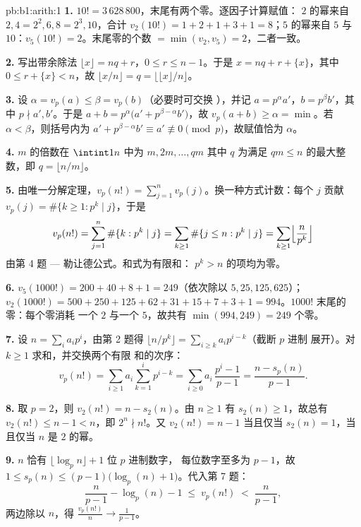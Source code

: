 \begin{solution}{pb:b1:arith:1}
\textbf{1.} $10! = 3\,628\,800$，末尾有两个零。逐因子计算赋值：
$2$ 的幂来自 $2, 4 = 2^2, 6, 8 = 2^3,
10$，合计 $v_2(10!) = 1 + 2 + 1 + 3 + 1 = 8$；$5$ 的幂来自
$5$ 与 $10$：$v_5(10!) = 2$。末尾零的个数 $=
\min(v_2, v_5) = 2$，二者一致。

\textbf{2.} 写出带余除法 $\lfloor x\rfloor = nq +
r$，$0 \leq r \leq n - 1$。于是 $x = nq + r + \{x\}$，其中 $0 \leq
r + \{x\} < n$，故 $\lfloor x/n \rfloor = q = \bigl\lfloor \lfloor
x \rfloor / n \bigr\rfloor$。

\textbf{3.} 设 $\alpha = v_p(a) \leq \beta = v_p(b)$（必要时可交换
），并记 $a = p^\alpha a'$，$b = p^\beta b'$，其中 $p
\nmid a', b'$。于是 $a + b = p^\alpha\bigl(a' + p^{\beta -
\alpha}b'\bigr)$，故 $v_p(a + b) \geq \alpha = \min$。若 $\alpha <
\beta$，则括号内为 $a' + p^{\beta-\alpha}b' \equiv a'
\not\equiv 0 \pmod p$，故赋值恰为 $\alpha$。

\textbf{4.} $m$ 的倍数在 $\intint1n$ 中为 $m, 2m, \dots,
qm$ 其中 $q$ 为满足 $qm \leq n$ 的最大整数，即 $q =
\lfloor n/m \rfloor$。

\textbf{5.} 由唯一分解定理，$v_p(n!) = \sum_{j=1}^{n}
v_p(j)$。换一种方式计数：每个 $j$ 贡献 $v_p(j) =
\#\{k \geq 1 : p^k \mid j\}$，于是
\[
v_p(n!) = \sum_{j=1}^n \#\{k : p^k \mid j\}
= \sum_{k\geq1} \#\{j \leq n : p^k \mid j\}
= \sum_{k\geq1} \Bigl\lfloor \frac n{p^k} \Bigr\rfloor
\]
由第 4 题 --- 勒让德公式。和式为有限和：
$p^k > n$ 的项均为零。

\textbf{6.} $v_5(1000!) = 200 + 40 + 8 + 1 = 249$（依次除以
$5, 25, 125, 625$）；$v_2(1000!) = 500 + 250 + 125 + 62 + 31 + 15 +
7 + 3 + 1 = 994$。$1000!$ 末尾的零：每个零消耗
一个 $2$ 与一个 $5$，故共有 $\min(994, 249) = 249$ 个零。

\textbf{7.} 设 $n = \sum_i a_ip^i$，由第 2 题得 $\lfloor
n/p^k \rfloor = \sum_{i \geq k} a_ip^{i-k}$（截断 $p$ 进制
展开）。对 $k \geq 1$ 求和，并交换两个有限
和的次序：
\[
v_p(n!) = \sum_{i\geq1} a_i \sum_{k=1}^{i} p^{i-k}
= \sum_{i\geq0} a_i\,\frac{p^i - 1}{p - 1}
= \frac{n - s_p(n)}{p - 1} .
\]

\textbf{8.} 取 $p = 2$，则 $v_2(n!) = n - s_2(n)$。由 $n \geq 1$
有 $s_2(n) \geq 1$，故总有 $v_2(n!) \leq n - 1 < n$，即 $2^n \nmid
n!$。又 $v_2(n!) = n - 1$ 当且仅当 $s_2(n) = 1$，当且仅当 $n$ 是
$2$ 的幂。

\textbf{9.} $n$ 恰有 $\lfloor \log_p n \rfloor + 1$ 位 $p$ 进制数字，
每位数字至多为 $p - 1$，故 $1 \leq s_p(n) \leq
(p-1)\bigl(\log_p(n) + 1\bigr)$。代入第 7 题：
\[
\frac n{p-1} - \log_p(n) - 1 \;\leq\; v_p(n!) \;<\; \frac n{p-1},
\]
两边除以 $n$，得 $\frac{v_p(n!)}n \to \frac1{p-1}$。


\end{solution}
